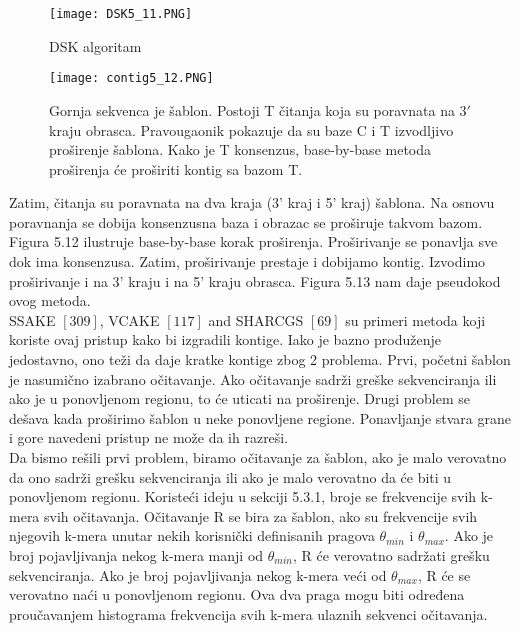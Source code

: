 \documentclass{article}
\begin{document}
\begin{figure}[h]
\centering
\texttt{[image: DSK5\_11.PNG]}
\caption{DSK algoritam}
\end{figure}

\begin{figure}[h]
\centering
\texttt{[image: contig5\_12.PNG]}
\caption{Gornja sekvenca je šablon. Postoji T čitanja koja su poravnata na $3'$ kraju obrasca. Pravougaonik pokazuje da su baze C i T izvodljivo proširenje šablona. Kako je T konsenzus, base-by-base metoda proširenja će proširiti kontig sa bazom T.}
\end{figure}

Zatim, čitanja su poravnata na dva kraja (3' kraj i 5' kraj) šablona. Na osnovu poravnanja se dobija konsenzusna baza i obrazac se proširuje takvom bazom. Figura 5.12 ilustruje base-by-base korak proširenja. Proširivanje se ponavlja sve dok ima konsenzusa. Zatim, proširivanje prestaje i dobijamo kontig. Izvodimo proširivanje i na 3' kraju i na 5' kraju obrasca. Figura 5.13 nam daje pseudokod ovog metoda. \\

SSAKE $[309]$, VCAKE $[117]$ and SHARCGS $[69]$ su primeri metoda koji koriste ovaj pristup kako bi izgradili kontige. Iako je bazno produženje jedostavno, ono teži da daje kratke kontige zbog 2 problema. Prvi, početni šablon je nasumično izabrano očitavanje. Ako očitavanje sadrži greške sekvenciranja ili ako je u ponovljenom regionu, to će uticati na proširenje. Drugi problem se dešava kada proširimo šablon u neke ponovljene regione. Ponavljanje stvara grane i gore navedeni pristup ne može da ih razreši. \\

Da bismo rešili prvi problem, biramo očitavanje za šablon, ako je malo verovatno da ono sadrži grešku sekvenciranja ili ako je malo verovatno da će biti u ponovljenom regionu. Koristeći ideju u sekciji 5.3.1, broje se frekvencije svih k-mera svih očitavanja. Očitavanje R se bira za šablon, ako su frekvencije svih njegovih k-mera unutar nekih korisnički definisanih pragova $\theta_{min}$ i $\theta_{max}$. Ako je broj pojavljivanja nekog k-mera manji od $\theta_{min}$, R će verovatno sadržati grešku sekvenciranja. Ako je broj pojavljivanja nekog k-mera veći od $\theta_{max}$, R će se verovatno naći u ponovljenom regionu. Ova dva praga mogu biti određena proučavanjem histograma frekvencija svih k-mera ulaznih sekvenci očitavanja.\\
\end{document}

